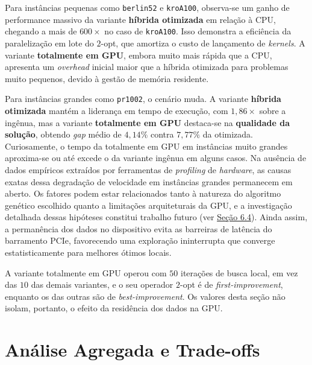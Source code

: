 Para instâncias pequenas como \texttt{berlin52} e \texttt{kroA100}, observa-se um ganho de performance massivo da variante \textbf{híbrida otimizada} em relação à CPU, chegando a mais de \(600\times\) no caso de \texttt{kroA100}.
Isso demonstra a eficiência da paralelização em lote do \(2\)-opt, que amortiza o custo de lançamento de \emph{kernels}.
A variante \textbf{totalmente em GPU}, embora muito mais rápida que a CPU, apresenta um \emph{overhead} inicial maior que a híbrida otimizada para problemas muito pequenos, devido à gestão de memória residente.

Para instâncias grandes como \texttt{pr1002}, o cenário muda.
A variante \textbf{híbrida otimizada} mantém a liderança em tempo de execução, com \(1{,}86\times\) sobre a ingênua, mas a variante \textbf{totalmente em GPU} destaca-se na \textbf{qualidade da solução}, obtendo \emph{gap} médio de \(4{,}14\%\) contra \(7{,}77\%\) da otimizada.
Curiosamente, o tempo da totalmente em GPU em instâncias muito grandes aproxima-se ou até excede o da variante ingênua em alguns casos.
Na ausência de dados empíricos extraídos por ferramentas de \emph{profiling} de \emph{hardware}, as causas exatas dessa degradação de velocidade em instâncias grandes permanecem em aberto.
Os fatores podem estar relacionados tanto à natureza do algoritmo genético escolhido quanto a limitações arquiteturais da GPU, e a investigação detalhada dessas hipóteses constitui trabalho futuro (ver \hyperref[sec-64-trabalhos-futuros]{Seção 6.4}).
Ainda assim, a permanência dos dados no dispositivo evita as barreiras de latência do barramento PCIe, favorecendo uma exploração ininterrupta que converge estatisticamente para melhores ótimos locais.

\begin{warning}\label{obs-fullgpu-iteracoes}
  A variante totalmente em GPU operou com \(50\) iterações de busca local, em vez das \(10\) das demais variantes, e o seu operador \(2\)-opt é de \emph{first-improvement}, enquanto os das outras são de \emph{best-improvement}.
  Os valores desta seção não isolam, portanto, o efeito da residência dos dados na GPU.
\end{warning}

\section{Análise Agregada e Trade-offs}\label{sec-43-analise-agregada}

